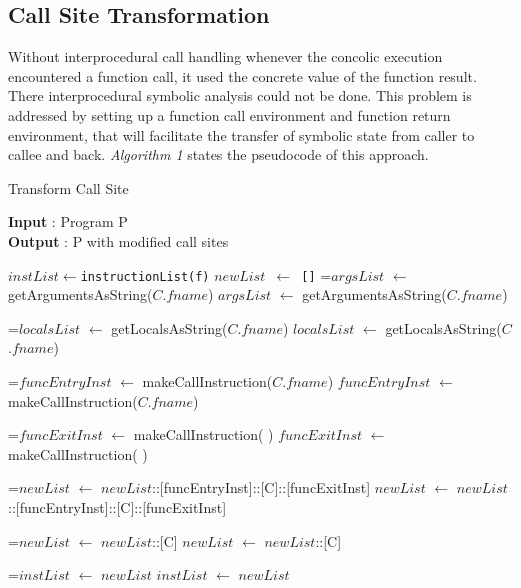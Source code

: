 \documentclass[12pt,oneside]{book}
\newcommand*{\thealgruleheight}{.75\baselineskip}
\newcommand*{\thealgruledepth}{.25\baselineskip}
\newcommand{\myState}[1]{%
    \setbox\statebox=\vbox{#1}%
    \edef\thealgruleheight{\dimexpr \the\ht\statebox+1pt\relax}%
    \edef\thealgruledepth{\dimexpr \the\dp\statebox+1pt\relax}%
    \ifdim\thealgruleheight<.75\baselineskip
        \def\thealgruleheight{\dimexpr .75\baselineskip+1pt\relax}%
    \fi
    \ifdim\thealgruledepth<.25\baselineskip
        \def\thealgruledepth{\dimexpr .25\baselineskip+1pt\relax}%
    \fi
    \State #1%
    \def\thealgruleheight{\dimexpr .75\baselineskip+1pt\relax}%
    \def\thealgruledepth{\dimexpr .25\baselineskip+1pt\relax}%
}
\begin{document}

\subsection{Call Site Transformation}
Without interprocedural call handling whenever the concolic execution encountered a function call, it used the concrete value of the function result. There interprocedural symbolic analysis could not be done. This problem is addressed by setting up a function call environment and function return environment, that will facilitate the transfer of symbolic state from caller to callee and back. \textit{Algorithm 1} states the pseudocode of this approach.\\


\begin{algorithm}[H]
  \caption{Transform Call Site}\label{transform call site}
  \small
  \vspace{4mm}
  {\textbf{Input} : Program P}\\
  {\textbf{Output} : P with modified call sites}
  \begin{algorithmic}[1]
      \vspace{0.8mm}
        \vspace{0.8mm}
        \State \texttt{$instList \gets $instructionList(f)}
        \State \texttt{$newList$ $\leftarrow$ []}
        \vspace{0.8mm}
          \vspace{0.8mm}
            \myState {$argsList$ $\gets$ getArgumentsAsString($C$.$fname$)}
            \myState {$localsList$ $\gets$ getLocalsAsString($C$.$fname$)}
			\myState {$funcEntryInst$ $\gets$ makeCallInstruction($C$.$fname$)}
			\myState {$funcExitInst$ $\gets$ makeCallInstruction( )}
			\myState {$newList$ $\gets$ $newList$::[funcEntryInst]::[C]::[funcExitInst]}
          \Else
            \myState {$newList$ $\gets$ $newList$::[C]}
          \EndIf
        \myState {$instList$ $\gets$ $newList$}  
        \EndFor
      \EndFor
    \EndProcedure
  \end{algorithmic}
\end{algorithm}
\end{document}
